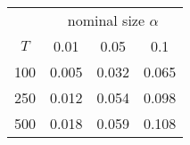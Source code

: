 % 
\begin{tabular}{cccc}
  \hline
  & \multicolumn{3}{c}{nominal size $\alpha$} \\
 $T$ & 0.01 & 0.05 & 0.1 \\
 \hline
100 & 0.005 & 0.032 & 0.065 \\ 
  250 & 0.012 & 0.054 & 0.098 \\ 
  500 & 0.018 & 0.059 & 0.108 \\ 
   \hline
\end{tabular}
